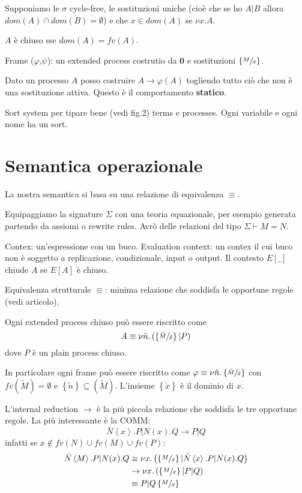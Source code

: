 \documentclass[a4paper,12pt]{article}
\theoremstyle{plain}
\theoremstyle{definition}
\theoremstyle{remark}
\newcommand{\set}[1]{\left\{#1\right\}}
\newcommand{\pa}[1]{\left(#1\right)}
\newcommand{\ang}[1]{\left<#1\right>}
\begin{document}
Supponiamo le $\sigma$ cycle-free, le sostituzioni uniche (cioè che se
ho $A|B$ allora $dom(A) \cap dom(B) = \emptyset$) e che $x\in dom(A)$
se $\nu x.A$.

$A$ \`e chiuso sse $dom(A) = fv(A)$.

Frame ($\varphi$,$\psi$): un extended process costrutio da
$\mathbf{0}$ e sostituzioni $\set{\sfrac{M}{x}}$.

Dato un processo $A$ posso costruire $A \rightarrow \varphi(A)$
togliendo tutto ciò che non è una sostituzione attiva. Questo è il
comportamento \textbf{statico}.


Sort system per tipare bene (vedi fig.2) terms e processes. Ogni
variabile e ogni nome ha un sort.

\section{Semantica operazionale}

La nostra semantica si basa su una relazione di equivalenza $\equiv$.

Equipaggiamo la signature $\Sigma$ con una teoria equazionale, per
esempio generata partendo da assiomi o rewrite rules. Avrò delle
relazioni del tipo $\Sigma \vdash M=N$.

Contex: un'espressione con un buco. Evaluation context: un contex il
cui buco non è soggetto a replicazione, condizionale, input o
output. Il contesto $E[\_]$ chiude $A$ se $E[A]$ \`e chiuso.

Equivalenza strutturale $\equiv$: minima relazione che soddisfa le
opportune regole (vedi articolo).

Ogni extended process chiuso può essere riscritto come
\[ A \equiv \nu \tilde n . \pa{ \set{\sfrac{\tilde M}{ \tilde x}} | P
  } \]
dove $P$ \`e un plain process chiuso.

In particolare ogni frame pu\`o essere riscritto come $\varphi \equiv
\nu \tilde n. \set{ \sfrac{\tilde M}{\tilde x}}$ con $fv(\tilde M) =
\emptyset$ e $\set{\tilde n} \subseteq (\tilde M)$. L'insieme
$\set{\tilde x}$ \`e il dominio di $x$.

L'internal reduction $\rightarrow$ \`e la pi\`u piccola relazione che
soddisfa le tre opportune regole. La pi\`u interessante \`e la COMM:
\[ \bar N \ang{x}.P | N(x).Q \rightarrow P|Q \]
infatti se $x\not\in fv(N) \cup fv(M) \cup fv(P)$:
\begin{align*}
  \bar{N}\ang{M}.P | N(x).Q & \equiv \nu x.\pa{ \set{\sfrac{M}{x}} | \bar
                              N\ang{x}.P | N(x).Q} \\
  & \rightarrow \nu x .\pa{\set{\sfrac{M}{x}}|P|Q} \\
  & \equiv P|Q\set{\sfrac{M}{x}}
\end{align*}
\end{document}
